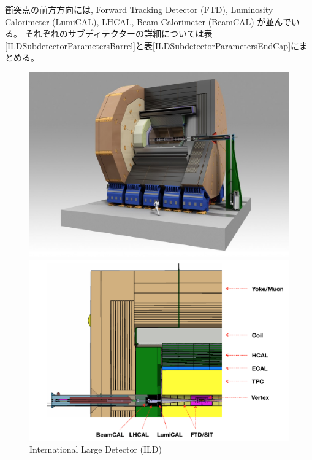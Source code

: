 衝突点の前方方向には, Forward Tracking Detector (FTD), Luminosity Calorimeter (LumiCAL), LHCAL, Beam Calorimeter (BeamCAL) が並んでいる。
それぞれのサブディテクターの詳細については表\ref{ILDSubdetectorParametersBarrel}と表\ref{ILDSubdetectorParametersEndCap}にまとめる。

\begin{figure}[htbp]
 \centering
 \begin{minipage}{1.0\textwidth}
  \centering
   \begin{minipage}{0.48\textwidth}
    \centering
    \includegraphics[width=1.0\textwidth, clip]{Figure/1Introduction/5-1InternationalLargeDetector.jpg}
   \end{minipage}
   \begin{minipage}{0.48\textwidth}
   \centering
    \includegraphics[width=1.0\textwidth, clip]{Figure/1Introduction/5-2InternationalLargeDetector.png}
   \end{minipage}
  \end{minipage}  
  \caption{International Large Detector (ILD) }
  \label{5-1InternationalLargeDetector}
\end{figure}


